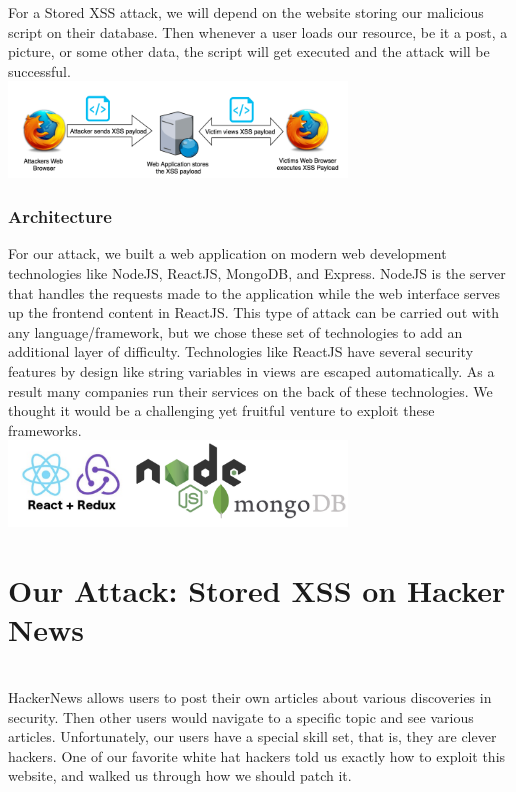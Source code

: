 \documentclass[conference]{IEEEtran}
\begin{document}
For a Stored XSS attack, we will depend on the website storing our malicious script on their database. Then whenever a user loads our resource, be it a post, a picture, or some other data, the script will get executed and the attack will be successful.\\
\includegraphics[width = 9cm]{stored-xss-diagram-example.png}\\

\subsubsection{Architecture}

For our attack, we built a web application on modern web development technologies like NodeJS, ReactJS, MongoDB, and Express. NodeJS is the server that handles the requests made to the application while the web interface serves up the frontend content in ReactJS. This type of attack can be carried out with any language/framework, but we chose these set of technologies to add an additional layer of difficulty. Technologies like ReactJS have several security features by design like string variables in views are escaped automatically. As a result many companies run their services on the back of these technologies. We thought it would be a challenging yet fruitful venture to exploit these frameworks.\\
\includegraphics[width = 9cm]{architecture.png}

\section{Our Attack: Stored XSS on Hacker News}\\

HackerNews allows users to post their own articles about various discoveries in security. Then other users would navigate to a specific topic and see various articles. Unfortunately, our users have a special skill set, that is, they are clever hackers. One of our favorite white hat hackers told us exactly how to exploit this website, and walked us through how we should patch it.\\
\end{document}
